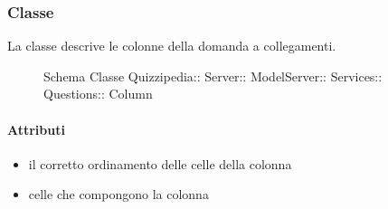 \subsubsection{Classe }
La classe descrive le colonne della domanda a collegamenti.
\begin{figure}[H]
\centering
\noindent{}
\caption[Schema Classe Column]{Schema Classe Quizzipedia:: Server:: ModelServer:: Services:: Questions:: Column}
\end{figure}
\paragraph{Attributi}
\begin{itemize}
\item {}
\newline
il corretto ordinamento delle celle della colonna
\item {}
\newline
celle che compongono la colonna
\end{itemize}
